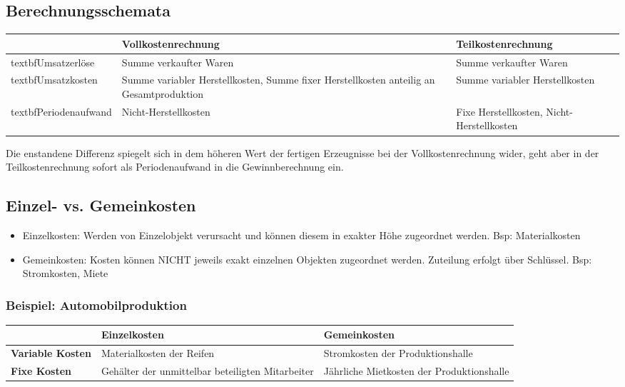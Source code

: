 \subsection{Berechnungsschemata}
\begin{table}[h]
\begin{tabularx}{\textwidth}{|l|X|X|}
	\hline
	& \textbf{Vollkostenrechnung} & \textbf{Teilkostenrechnung} \\
	\hline\hline
	textbf{Umsatzerlöse} & Summe verkaufter Waren & Summe verkaufter Waren \\
	\hline
	textbf{Umsatzkosten} & Summe variabler Herstellkosten, Summe fixer Herstellkosten anteilig an Gesamtproduktion & Summe variabler Herstellkosten \\
	\hline
	textbf{Periodenaufwand} & Nicht-Herstellkosten & Fixe Herstellkosten, Nicht-Herstellkosten \\
	\hline
\end{tabularx}
\end{table}

Die enstandene Differenz spiegelt sich in dem höheren Wert der fertigen Erzeugnisse bei der Vollkostenrechnung wider, geht aber in der Teilkostenrechnung sofort als Periodenaufwand in die Gewinnberechnung ein.

\subsection{Einzel- vs. Gemeinkosten}
\begin{itemize}
	\item Einzelkosten: Werden von Einzelobjekt verursacht und können diesem in exakter Höhe zugeordnet werden. Bsp: Materialkosten
	\item Gemeinkosten: Kosten können NICHT jeweils exakt einzelnen Objekten zugeordnet werden. Zuteilung erfolgt über Schlüssel. Bsp: Stromkosten, Miete
\end{itemize}

\subsubsection{Beispiel: Automobilproduktion}
\begin{table}[h]
\begin{tabularx}{\textwidth}{|l|X|X|}
	\hline
	& \textbf{Einzelkosten} & \textbf{Gemeinkosten} \\
	\hline\hline
	\textbf{Variable Kosten} & Materialkosten der Reifen & Stromkosten der Produktionshalle \\
	\hline
	\textbf{Fixe Kosten} & Gehälter der unmittelbar beteiligten Mitarbeiter & Jährliche Mietkosten der Produktionshalle \\
	\hline
\end{tabularx}
\end{table}


